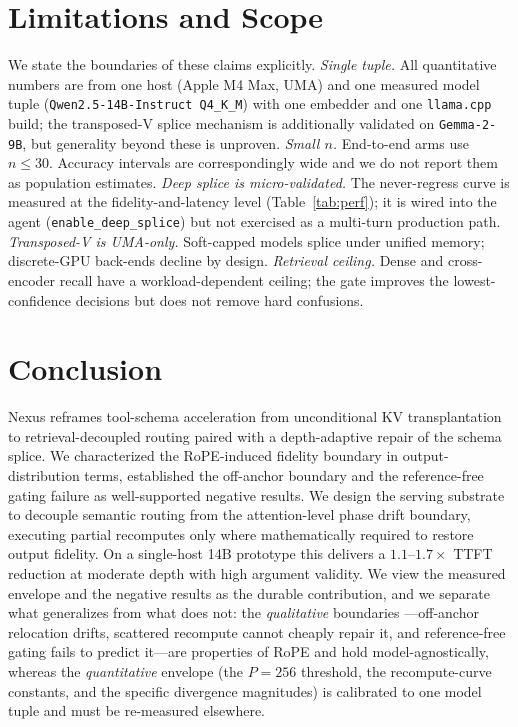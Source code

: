 \documentclass[10pt,conference]{IEEEtran}
\newcommand{\code}[1]{\texttt{\small #1}}
\begin{document}
\section{Limitations and Scope}
\label{sec:scope}
We state the boundaries of these claims explicitly.
\emph{Single tuple.} All quantitative numbers are from one host (Apple M4 Max, UMA) and one
measured model tuple (\code{Qwen2.5-14B-Instruct Q4\_K\_M}) with one embedder and one \code{llama.cpp} build; the
transposed-V splice mechanism is additionally validated on \code{Gemma-2-9B}, but generality beyond
these is unproven.
\emph{Small $n$.} End-to-end arms use $n\le30$. Accuracy intervals are correspondingly wide and
we do not report them as population estimates.
\emph{Deep splice is micro-validated.} The never-regress curve is measured at the
fidelity-and-latency level (Table~\ref{tab:perf}); it is wired into the agent
(\code{enable\_deep\_splice}) but not exercised as a multi-turn production path.
\emph{Transposed-V is UMA-only.} Soft-capped models splice under unified memory; discrete-GPU
back-ends decline by design.
\emph{Retrieval ceiling.} Dense and cross-encoder recall have a workload-dependent ceiling; the
gate improves the lowest-confidence decisions but does not remove hard confusions.

\section{Conclusion}
Nexus reframes tool-schema acceleration from unconditional KV transplantation to
retrieval-decoupled routing paired with a depth-adaptive repair of the schema splice. We
characterized the RoPE-induced fidelity boundary in output-distribution terms, established the
off-anchor boundary and the reference-free gating failure as well-supported negative results.
We design the serving substrate to decouple semantic routing from the attention-level phase drift boundary,
executing partial recomputes only where mathematically required to restore output fidelity.
On a single-host 14B prototype this delivers a $1.1$--$1.7\times$ TTFT reduction at moderate depth
with high argument validity. We view the measured envelope and the negative results as the durable
contribution, and we separate what generalizes from what does not: the \emph{qualitative} boundaries
---off-anchor relocation drifts, scattered recompute cannot cheaply repair it, and reference-free
gating fails to predict it---are properties of RoPE and hold model-agnostically, whereas the
\emph{quantitative} envelope (the $P=256$ threshold, the recompute-curve constants, and the specific
divergence magnitudes) is calibrated to one model tuple and must be re-measured elsewhere.



\end{document}
